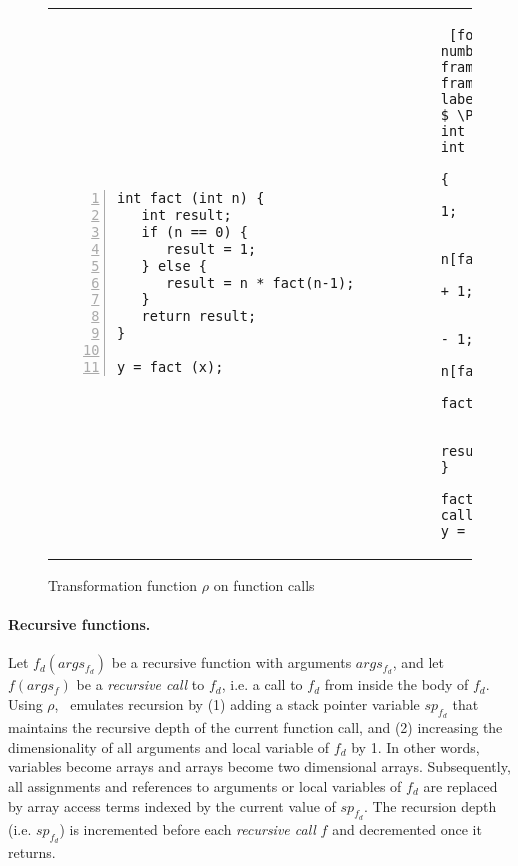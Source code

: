 \begin{figure}[bt]
\centering
\begin{tabular}{p{}|p{0.01in}p{}}
\begin{Verbatim}[fontsize=\relsize{-2.0}, numbersep=4pt,numbers=left,
frame=topline, framesep=4mm, label=\fbox{Program \Pm}]
int fact (int n) {
   int result;
   if (n == 0) {
      result = 1;
   } else {
      result = n * fact(n-1);
   } 
   return result;
}

y = fact (x);
\end{Verbatim}
& &
\begin{Verbatim} [fontsize=\relsize{-2.0}, numbersep=4pt,numbers=left,
frame=topline, framesep=4mm, label=\fbox{Program $\rho ( $ \Pm $)$}]
int fact::result [];
int fact (int [] n) {
    if (n[fact::sp] == 0) {
        result[fact::sp] = 1;    
    } else {
        n[fact::sp + 1] = n[fact::sp] - 1;
        fact::sp = fact::sp + 1;
        call_func(fact);
        fact::sp = fact::sp - 1;
        result[fact::sp] = n[fact::sp]
                   * fact::ret[fact::sp+1];    
    }
    return result[fact::sp];
}

fact::n[0] = x;
call_func(fact);
y = fact::ret[0];
\end{Verbatim}
\end{tabular}
\caption{Transformation function $\rho$ on function calls}
\label{fig:trans:function_call}
\end{figure}
%
\paragraph{Recursive functions.} 
Let $f_d (args_{f_d})$ be a recursive function with arguments $args_{f_d}$,
and let $f(args_f)$ be a {\em recursive call} to $f_d$, i.e. a call to $f_d$
from inside the body of $f_d$. Using $\rho$,
\mytool~emulates recursion by (1) adding a stack pointer variable
$sp_{f_d}$ that maintains the recursive depth of the current function call, 
and (2) increasing the dimensionality of all arguments and local variable of $f_d$
by 1. In other words, variables become arrays and arrays become two dimensional 
arrays. Subsequently, all assignments and references to arguments or local variables
of $f_d$ are replaced by array access terms indexed by the current value 
of $sp_{f_d}$.
The recursion depth (i.e. $sp_{f_d}$) is incremented before
each {\em recursive call} $f$ and decremented once it returns. 

